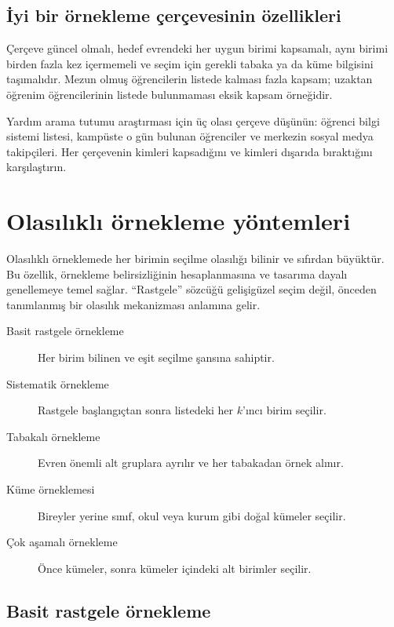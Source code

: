 \subsection{İyi bir örnekleme çerçevesinin özellikleri}

Çerçeve güncel olmalı, hedef evrendeki her uygun birimi kapsamalı, aynı birimi
birden fazla kez içermemeli ve seçim için gerekli tabaka ya da küme bilgisini
taşımalıdır. Mezun olmuş öğrencilerin listede kalması fazla kapsam; uzaktan
öğrenim öğrencilerinin listede bulunmaması eksik kapsam örneğidir.

\begin{etkinlik}
Yardım arama tutumu araştırması için üç olası çerçeve düşünün: öğrenci bilgi
sistemi listesi, kampüste o gün bulunan öğrenciler ve merkezin sosyal medya
takipçileri. Her çerçevenin kimleri kapsadığını ve kimleri dışarıda
bıraktığını karşılaştırın.
\end{etkinlik}

\section{Olasılıklı örnekleme yöntemleri}

Olasılıklı örneklemede her birimin seçilme olasılığı bilinir ve sıfırdan
büyüktür. Bu özellik, örnekleme belirsizliğinin hesaplanmasına ve tasarıma
dayalı genellemeye temel sağlar. ``Rastgele'' sözcüğü gelişigüzel seçim değil,
önceden tanımlanmış bir olasılık mekanizması anlamına gelir.

\begin{description}
  \item[Basit rastgele örnekleme] Her birim bilinen ve eşit seçilme şansına sahiptir.
  \item[Sistematik örnekleme] Rastgele başlangıçtan sonra listedeki her $k$'ıncı birim seçilir.
  \item[Tabakalı örnekleme] Evren önemli alt gruplara ayrılır ve her tabakadan örnek alınır.
  \item[Küme örneklemesi] Bireyler yerine sınıf, okul veya kurum gibi doğal kümeler seçilir.
  \item[Çok aşamalı örnekleme] Önce kümeler, sonra kümeler içindeki alt birimler seçilir.
\end{description}

\subsection{Basit rastgele örnekleme}

